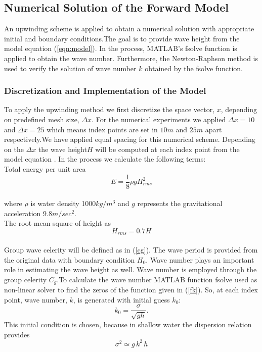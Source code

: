 \subsection{Numerical Solution of the Forward Model}
An upwinding scheme is applied to obtain a numerical solution with appropriate initial and boundary conditions.The goal is to provide wave height from the model equation (\ref{eqn:model}). In the process, MATLAB's fsolve function is applied to obtain the wave number. Furthermore, the Newton-Raphson method is used to verify the solution of wave number $k$ obtained by the fsolve function.

\subsubsection{Discretization and Implementation of the Model}
 To apply the upwinding method we first discretize the space vector, ${x}$, depending on predefined mesh size, ${\Delta x}$. For the numerical experiments we applied $\Delta x=10$ and ${\Delta x=25}$ which means index points are set in ${10m}$ and ${25m}$ apart respectively.We have applied equal spacing for this numerical scheme. Depending on the ${\Delta x}$ the wave height${H}$ will be computed at each index point from the model equation . In the process we calculate the following terms:\\
Total energy per unit area
$${E=\frac{1}{8}\rho g H_{rms}^2}$$\\
where ${\rho}$ is water density 1000${kg/m^3}$ and ${g}$ represents the gravitational acceleration ${9.8m/sec^2}$. \\
The root mean square of height as\\
$${H_{rms}=0.7 H}$$\\
Group wave celerity will be defined as in  (\ref{cg}). The wave period is provided from the original data with boundary condition ${H_{0}}$. 
Wave number plays an important role in estimating the wave height as well. Wave number is employed through the group celerity ${C_g}$.To calculate the wave number MATLAB function fsolve used as non-linear solver to find the zeros of the function given in (\ref{fk}). %
So, at each index point, wave number, $k$, is generated with initial guess $k_0$:
$$k_0=\frac{\sigma}{\sqrt{gh}}.$$
This initial condition is chosen, because in shallow water the dispersion relation provides \\
$${\sigma^2\simeq g\,k^2\,h}$$

